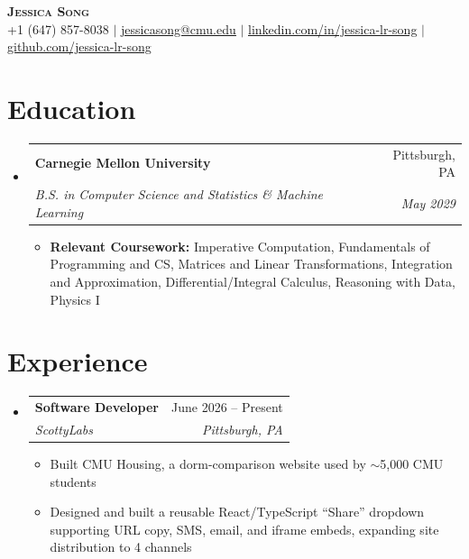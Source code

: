 \documentclass[letterpaper,11pt]{article}
\makeatletter
\newcommand{\resumeItem}[1]{
  \item\small{
    {#1 \vspace{-2pt}}
  }
}
\newcommand{\resumeSubheading}[4]{
  \vspace{-2pt}\item
    \begin{tabular*}{0.97\textwidth}[t]{l@{\extracolsep{\fill}}r}
      \textbf{#1} & #2 \\
      \textit{\small#3} & \textit{\small #4} \\
    \end{tabular*}\vspace{-7pt}
}
\newcommand{\resumeSubHeadingListStart}{\begin{itemize}[leftmargin=0.15in, label={}]}
\newcommand{\resumeSubHeadingListEnd}{\end{itemize}}
\newcommand{\resumeItemListStart}{\begin{itemize}}
\newcommand{\resumeItemListEnd}{\end{itemize}\vspace{-5pt}}
\makeatother
\begin{document}
\begin{center}
    \textbf{\Huge \scshape Jessica Song} \\ \vspace{1pt}
    \small +1 (647) 857-8038 $|$ \href{mailto:jessicasong@cmu.edu}{\underline{jessicasong@cmu.edu}} $|$
    \href{https://www.linkedin.com/in/jessica-lr-song}{\underline{linkedin.com/in/jessica-lr-song}} $|$
    \href{https://github.com/jessica-lr-song}{\underline{github.com/jessica-lr-song}}
\end{center}


\section{Education}
  \resumeSubHeadingListStart
    \resumeSubheading
      {Carnegie Mellon University}{Pittsburgh, PA}
      {B.S. in Computer Science and Statistics \& Machine Learning}{May 2029}
      \resumeItemListStart
        \resumeItem{\textbf{Relevant Coursework:} Imperative Computation, Fundamentals of Programming and CS, Matrices and Linear Transformations, Integration and Approximation, Differential/Integral Calculus, Reasoning with Data, Physics I}
      \resumeItemListEnd
  \resumeSubHeadingListEnd

\section{Experience}
  \resumeSubHeadingListStart

    \resumeSubheading
      {Software Developer}{June 2026 -- Present}
      {ScottyLabs}{Pittsburgh, PA}
      \resumeItemListStart
        \resumeItem{Built CMU Housing, a dorm-comparison website used by $\sim$5,000 CMU students}
        \resumeItem{Designed and built a reusable React/TypeScript ``Share'' dropdown supporting URL copy, SMS, email, and iframe embeds, expanding site distribution to 4 channels}
      \resumeItemListEnd

  \resumeSubHeadingListEnd

\end{document}

